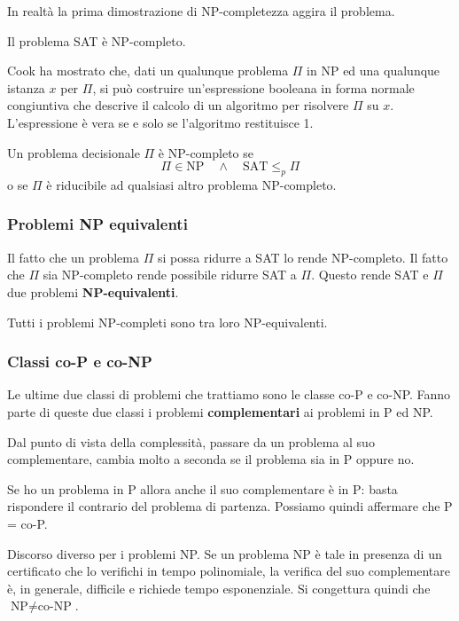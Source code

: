 In realt\`a la prima dimostrazione di NP-completezza aggira il problema.

\begin{theorem}[Cook]
	Il problema SAT \`e NP-completo.
\end{theorem}

Cook ha mostrato che, dati un qualunque problema $\Pi$ in NP ed una qualunque istanza $x$ per $\Pi$, si pu\`o costruire
un'espressione booleana in forma normale congiuntiva che descrive il calcolo di un algoritmo per risolvere $\Pi$ su $x$.
L'espressione \`e vera se e solo se l'algoritmo restituisce 1.

\begin{theorem}
	Un problema decisionale $\Pi$ \`e NP-completo se
	\[ \Pi \in \text{NP} \quad \wedge \quad \text{SAT} \leq_p \Pi \]
	o se $\Pi$ \`e riducibile ad qualsiasi altro problema NP-completo.
\end{theorem}

\subsubsection{Problemi NP equivalenti}
Il fatto che un problema $\Pi$ si possa ridurre a SAT lo rende NP-completo. Il fatto che $\Pi$ sia NP-completo rende
possibile ridurre SAT a $\Pi$. Questo rende SAT e $\Pi$ due problemi \textbf{NP-equivalenti}.

\begin{theorem}
	Tutti i problemi NP-completi sono tra loro NP-equivalenti.
\end{theorem}

\subsubsection{Classi co-P e co-NP}
Le ultime due classi di problemi che trattiamo sono le classe co-P e co-NP. Fanno parte di queste due classi i problemi
\textbf{complementari} ai problemi in P ed NP.

Dal punto di vista della complessit\`a, passare da un problema al suo complementare, cambia molto a seconda se il problema
sia in P oppure no.

Se ho un problema in P allora anche il suo complementare \`e in P: basta rispondere il contrario del problema di partenza.
Possiamo quindi affermare che P = co-P.

Discorso diverso per i problemi NP. Se un problema NP \`e tale in presenza di un certificato che lo verifichi in tempo
polinomiale, la verifica del suo complementare \`e, in generale, difficile e richiede tempo esponenziale. Si congettura
quindi che $\text{NP} \neq \text{co-NP}$.